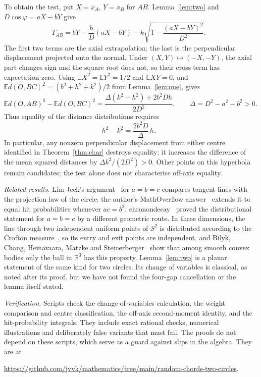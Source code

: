 \documentclass[11pt]{amsart}
\theoremstyle{remark}
\newcommand{\R}{\mathbb{R}}
\newcommand{\E}{\mathbb{E}}
\begin{document}
To obtain the test, put $X=x_A$, $Y=x_B$ for $AB$. Lemma~\ref{lem:two} and $D\cos\varphi=aX-bY$ give
\[
T_{AB}=bY-\frac{h}{D}(aX-bY)
-k\sqrt{1-\frac{(aX-bY)^2}{D^2}}.
\]
The first two terms are the axial extrapolation; the last is the perpendicular displacement projected onto the normal. Under $(X,Y)\mapsto(-X,-Y)$, the axial part changes sign and the square root does not, so their cross term has expectation zero. Using $\E X^2=\E Y^2=1/2$ and $\E XY=0$, and $\E d(O,BC)^2=(b^2+h^2+k^2)/2$ from Lemma~\ref{lem:one}, gives
\begin{equation}\label{eq:offaxis}
\E d(O,AB)^2-\E d(O,BC)^2
=\frac{\Delta(k^2-h^2)+2b^2Dh}{2D^2},
\qquad \Delta=D^2-a^2-b^2>0.
\end{equation}
Thus equality of the distance distributions requires
\[
h^2-k^2=\frac{2b^2D}{\Delta}\,h.
\]
In particular, any nonzero perpendicular displacement from either centre identified in Theorem~\ref{thm:char} destroys equality: it increases the difference of the mean squared distances by $\Delta k^2/(2D^2)>0$. Other points on this hyperbola remain candidates; the test alone does not characterise off-axis equality.

\emph{Related results.} Lim Jeck's argument~\cite{MSE} for $a=b=c$ compares tangent lines with the projection law of the circle; the author's MathOverflow answer~\cite{MOA} extends it to equal hit probabilities whenever $ac=b^2$. chronondecay~\cite{MSE} proved the distributional statement for $a=b=c$ by a different geometric route. In three dimensions, the line through two independent uniform points of $S^2$ is distributed according to the Crofton measure~\cite[Lemma~8]{AEN}, so its entry and exit points are independent, and Bilyk, Chang, Hein\"avaara, Matzke and Steinerberger~\cite{BCHMS} show that among smooth convex bodies only the ball in $\R^3$ has this property. Lemma~\ref{lem:two} is a planar statement of the same kind for two circles. Its change of variables is classical, as noted after its proof, but we have not found the four-gap cancellation or the lemma itself stated.

\emph{Verification.} Scripts check the change-of-variables calculation, the weight comparison and centre classification, the off-axis second-moment identity, and the hit-probability integrals. They include exact rational checks, numerical illustrations and deliberately false variants that must fail. The proofs do not depend on these scripts, which serve as a guard against slips in the algebra. They are at
\begin{center}\small\url{https://github.com/jvvk/mathematics/tree/main/random-chords-two-circles}.\end{center}
\end{document}
